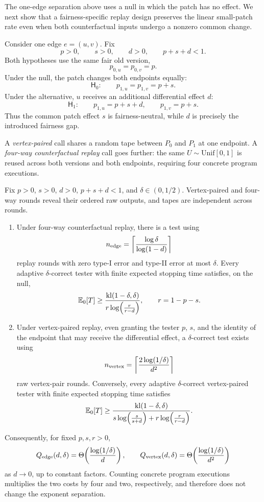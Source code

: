 The one-edge separation above uses a null in which the patch has no effect.  We
next show that a fairness-specific replay design preserves the linear small-patch
rate even when both counterfactual inputs undergo a nonzero common change.

Consider one edge \(e=(u,v)\).  Fix
\[
p>0,\qquad s>0,\qquad d>0,\qquad p+s+d<1.
\]
Both hypotheses use the same fair old version,
\[
p_{0,u}=p_{0,v}=p.
\]
Under the null, the patch changes both endpoints equally:
\[
\mathsf H_0:
\qquad
p_{1,u}=p_{1,v}=p+s.
\]
Under the alternative, \(u\) receives an additional differential effect \(d\):
\[
\mathsf H_1:
\qquad
p_{1,u}=p+s+d,
\qquad
p_{1,v}=p+s.
\]
Thus the common patch effect \(s\) is fairness-neutral, while \(d\) is precisely
the introduced fairness gap.

A \emph{vertex-paired} call shares a random tape between \(P_0\) and \(P_1\) at
one endpoint.  A \emph{four-way counterfactual replay} call goes further: the same
\(U\sim\mathrm{Unif}[0,1]\) is reused across both versions and both endpoints,
requiring four concrete program executions.

\begin{theorem}
\label{thm:counterfactual-replay}
Fix \(p>0\), \(s>0\), \(d>0\), \(p+s+d<1\), and
\(\delta\in(0,1/2)\).  Vertex-paired and four-way rounds reveal their ordered
raw outputs, and tapes are independent across rounds.

\begin{enumerate}[label=(\roman*)]
\item Under four-way counterfactual replay, there is a test using
\[
n_{\rm edge}
=
\left\lceil
\frac{\log\delta}{\log(1-d)}
\right\rceil
\]
replay rounds with zero type-I error and type-II error at most \(\delta\).
Every adaptive \(\delta\)-correct tester with finite expected stopping time
satisfies, on the null,
\[
\mathbb{E}_0[T]
\ge
\frac{\mathrm{kl}(1-\delta,\delta)}
{r\log\!\left(\frac{r}{r-d}\right)},
\qquad
r=1-p-s.
\]

\item Under vertex-paired replay, even granting the tester \(p\), \(s\), and the
identity of the endpoint that may receive the differential effect, a
\(\delta\)-correct test exists using
\[
n_{\rm vertex}
=
\left\lceil
\frac{2\log(1/\delta)}{d^2}
\right\rceil
\]
raw vertex-pair rounds.  Conversely, every adaptive \(\delta\)-correct
vertex-paired tester with finite expected stopping time satisfies
\[
\mathbb{E}_0[T]
\ge
\frac{\mathrm{kl}(1-\delta,\delta)}
{
s\log\!\left(\frac{s}{s+d}\right)
+
r\log\!\left(\frac{r}{r-d}\right)
}.
\]
\end{enumerate}

Consequently, for fixed \(p,s,r>0\),
\[
Q_{\rm edge}(d,\delta)
=
\Theta\!\left(
\frac{\log(1/\delta)}{d}
\right),
\qquad
Q_{\rm vertex}(d,\delta)
=
\Theta\!\left(
\frac{\log(1/\delta)}{d^2}
\right)
\]
as \(d\to0\), up to constant factors.  Counting concrete program executions
multiplies the two costs by four and two, respectively, and therefore does not
change the exponent separation.
\end{theorem}

